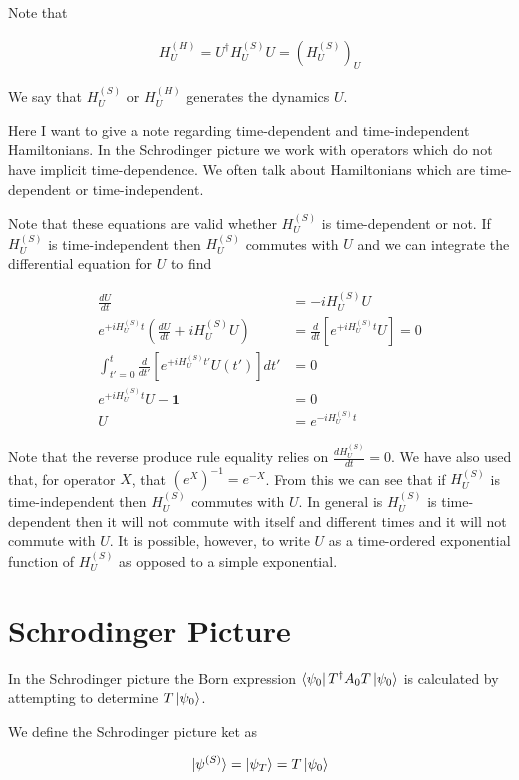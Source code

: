 \documentclass[12pt]{article}
\newcommand{\bv}[1]{\boldsymbol{#1}}
\begin{document}
Note that

\begin{align}
H_U^{(H)} = U^{\dag}H_U^{(S)}U = \left(H_U^{(S)}\right)_U
\end{align}

We say that $H_U^{(S)}$ or $H_U^{(H)}$ generates the dynamics $U$.

Here I want to give a note regarding time-dependent and time-independent Hamiltonians.
In the Schrodinger picture we work with operators which do not have implicit time-dependence.
We often talk about Hamiltonians which are time-dependent or time-independent.


Note that these equations are valid whether $H_U^{(S)}$ is time-dependent or not.
If $H_U^{(S)}$ is time-independent then $H_U^{(S)}$ commutes with $U$ and we can integrate the differential equation for $U$ to find

\begin{align}
\frac{dU}{dt} &= -iH_U^{(S)} U \nonumber \\
e^{+iH_U^{(S)} t} \left(\frac{dU}{dt} +iH_U^{(S)} U\right) &= \frac{d}{dt}\left[e^{+iH_U^{(S)} t}U\right] = 0 \nonumber\\
\int_{t'=0}^t \frac{d}{dt'}\left[e^{+iH_U^{(S)} t'}U(t')\right]  dt' &= 0\\
e^{+iH_U^{(S)} t}U - \bv{1} &= 0\\
U &= e^{-iH_U^{(S)} t}
\end{align}

Note that the reverse produce rule equality relies on $\frac{dH_U^{(S)}}{dt} =0$.
We have also used that, for operator $X$, that $\left(e^X\right)^{-1} = e^{-X}$.
From this we can see that if $H_U^{(S)}$ is time-independent then $H_U^{(S)}$ commutes with $U$.
In general is $H_U^{(S)}$ is time-dependent then it will not commute with itself and different times and it will not commute with $U$.
It is possible, however, to write $U$ as a time-ordered exponential function of $H_U^{(S)}$ as opposed to a simple exponential.

\section{Schrodinger Picture}

In the Schrodinger picture the Born expression $\bra{\psi_0}T^{\dag}A_0 T\ket{\psi_0}$ is calculated by attempting to determine $T\ket{\psi_0}$.

We define the Schrodinger picture ket as

\begin{align}
\ket{\psi^{(S)}} = \ket{\psi_T} = T\ket{\psi_0}
\end{align}
\end{document}
